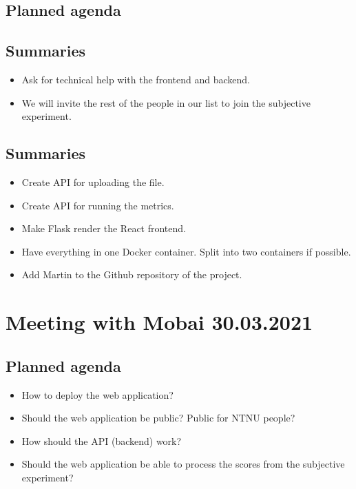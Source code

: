\subsection*{Planned agenda}
\subsection*{Summaries}
\begin{itemize}
    \item Ask for technical help with the frontend and backend.
    \item We will invite the rest of the people in our list to join the subjective experiment.
\end{itemize}

\subsection*{Summaries}
\begin{itemize}
    \item Create API for uploading the file.
    \item Create API for running the metrics. 
    \item Make Flask render the React frontend. 
    \item Have everything in one Docker container. Split into two containers if possible.
    \item Add Martin to the Github repository of the project.
\end{itemize}


\section*{Meeting with Mobai 30.03.2021}
\subsection*{Planned agenda}
\begin{itemize}
    \item How to deploy the web application?
    \item Should the web application be public? Public for NTNU people?
    \item How should the API (backend) work?
    \item Should the web application be able to process the scores from the subjective experiment?
\end{itemize}

